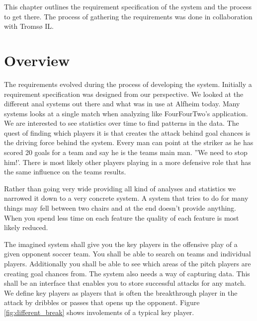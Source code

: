 This chapter outlines the requirement specification of the system and the process to get there. The process of gathering the requirements was done in collaboration with Tromsø IL.

\section{Overview}
The requirements evolved during the process of developing the system. Initially a requirement specification was designed from our perspective. We looked at the different anal systems out there and what was in use at Alfheim today. Many systems looks at a single match when analyzing like FourFourTwo’s application. We are interested to see statistics over time to find patterns in the data. The quest of finding which players it is that creates the attack behind goal chances is the driving force behind the system. Every man can point at the striker as he has scored 20 goals for a team and say he is the teams main man. ''We need to stop him!'. There is most likely other players playing in a more defensive role that has the same influence on the teams results.  

Rather than going very wide providing all kind of analyses and statistics we narrowed it down to a very concrete system. A system that tries to do for many things may fell between two chairs and at the end doesn't provide anything. When you spend less time on each feature the quality of each feature is most likely reduced.

The imagined system shall give you the key players in the offensive play of a given opponent soccer team. You shall be able to search on teams and individual players. Additionally you shall be able to see which areas of the pitch players are creating goal chances from. The system also needs a way of capturing data. This shall be an interface that enables you to store successful attacks for any match. We define key players as players that is often the breakthrough player in the attack by dribbles or passes that opens up the opponent. Figure \ref{fig:different_break} shows involements of a typical key player.

